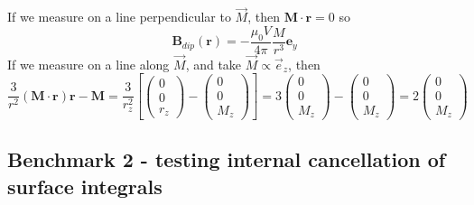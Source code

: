 If we measure on a line perpendicular to $\vec{M}$, then ${\bm M} \cdot {\bm r}=0$ so
\[
{\bm B}_{dip}({\bm r}) = -\frac{\mu_0 V}{4\pi} \frac{M}{r^3}   {\bm e}_y
\]
If we measure on a line along $\vec{M}$, and take $\vec{M} \propto \vec{e}_z$, then 
\[
\frac{3}{r^2} ({\bm M} \cdot {\bm r}) {\bm r} - {\bm M}
=
\frac{3}{r_z^2} 
\left[
\left(
\begin{array}{c}
0 \\ 0 \\ r_z
\end{array}
\right)
-
\left(
\begin{array}{c}
0 \\ 0 \\ M_z
\end{array}
\right)
\right]
=
3\left(
\begin{array}{c}
0 \\ 0 \\ M_z
\end{array}
\right)
-
\left(
\begin{array}{c}
0 \\ 0 \\ M_z
\end{array}
\right)
=
2
\left(
\begin{array}{c}
0 \\ 0 \\ M_z
\end{array}
\right)
\]













\subsection*{Benchmark 2 - testing internal cancellation of surface integrals} 

